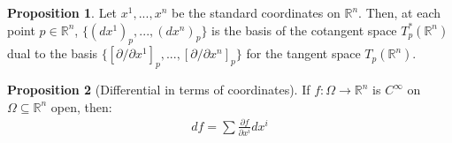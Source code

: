 \documentclass[11pt]{scrartcl}
\newcommand{\R}[0]{\mathbb{R}}
\theoremstyle{definition}
\newtheorem{prop}{Proposition}
\theoremstyle{remark}
\begin{document}
{\begin{prop}
	Let $x^1, ..., x^n$ be the standard coordinates on $\R^n$. Then, at each point $p \in \R^n$, $\{ (dx^1)_p, ..., (dx^n)_p \}$ is the basis of the cotangent space $T_p^*(\R^n)$ dual to the basis $\{ [\partial/\partial x^1]_p, ..., [\partial / \partial x^n]_p \}$ for the tangent space $T_p(\R^n)$. 
\end{prop}

\begin{prop}[Differential in terms of coordinates]
	If $f: \Omega \rightarrow \R^n$ is $C^\infty$ on $\Omega \subseteq \R^n$ open, then: 
	\begin{align*}
		df = \sum \frac{\partial f}{\partial x^i} dx^i
	\end{align*}
\end{prop}

}
\end{document}
